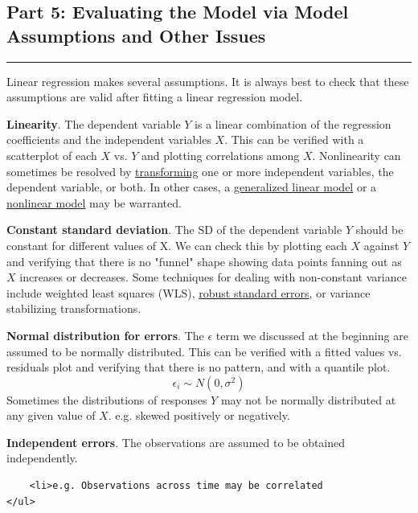 \documentclass[11pt]{article}
\begin{document}
    \subsection{Part 5: Evaluating the Model via Model Assumptions and Other
Issues}\label{part-5-evaluating-the-model-via-model-assumptions-and-other-issues}

\begin{center}\rule{0.5\linewidth}{\linethickness}\end{center}

Linear regression makes several assumptions. It is always best to check
that these assumptions are valid after fitting a linear regression
model.

\textbf{Linearity}. The dependent variable \(Y\) is a linear combination
of the regression coefficients and the independent variables \(X\). This
can be verified with a scatterplot of each \(X\) vs. \(Y\) and plotting
correlations among \(X\). Nonlinearity can sometimes be resolved by
\href{https://onlinecourses.science.psu.edu/stat501/node/318}{transforming}
one or more independent variables, the dependent variable, or both. In
other cases, a
\href{https://en.wikipedia.org/wiki/Generalized_linear_model}{generalized
linear model} or a
\href{https://en.wikipedia.org/wiki/Nonlinear_regression}{nonlinear
model} may be warranted.

\textbf{Constant standard deviation}. The SD of the dependent variable
\(Y\) should be constant for different values of X. We can check this by
plotting each \(X\) against \(Y\) and verifying that there is no
"funnel" shape showing data points fanning out as \(X\) increases or
decreases. Some techniques for dealing with non-constant variance
include weighted least squares (WLS),
\href{https://en.wikipedia.org/wiki/Heteroscedasticity-consistent_standard_errors}{robust
standard errors}, or variance stabilizing transformations.

\textbf{Normal distribution for errors}. The \(\epsilon\) term we
discussed at the beginning are assumed to be normally distributed. This
can be verified with a fitted values vs. residuals plot and verifying
that there is no pattern, and with a quantile plot.
\[ \epsilon_i \sim N(0, \sigma^2)\] Sometimes the distributions of
responses \(Y\) may not be normally distributed at any given value of
\(X\). e.g. skewed positively or negatively.

\textbf{Independent errors}. The observations are assumed to be obtained
independently.

\begin{verbatim}
    <li>e.g. Observations across time may be correlated
</ul>
\end{verbatim}
\end{document}
